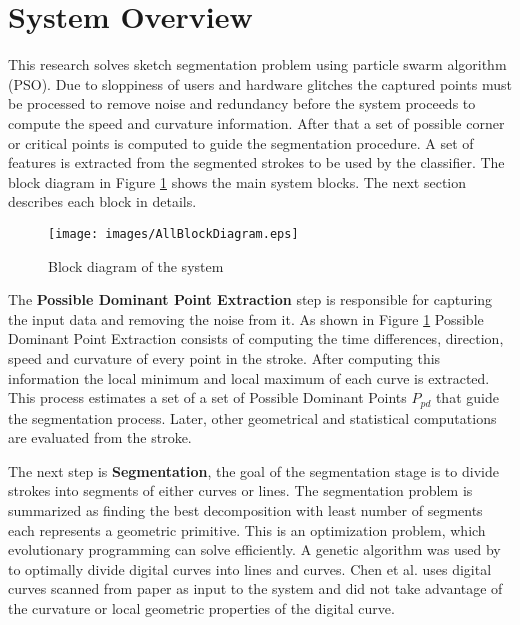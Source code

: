 \section{System Overview}
\label{sec:AnOverviewOfTheSystem}
   This research solves sketch segmentation problem using particle swarm algorithm (PSO).  Due to sloppiness of users and hardware glitches the captured points must be processed to remove noise and redundancy before the system proceeds to compute the speed and curvature information. After that a set of possible corner or critical points is computed to guide the segmentation procedure.  A set of features is extracted from the segmented strokes to be used by the classifier.  %
The block diagram in Figure \ref{fig:Blockdiagram} shows the main system blocks. The next section describes each block in details.
\begin{figure}[]
	\centering
	
\begin{center}
	\texttt{[image: images/AllBlockDiagram.eps]}
	\caption[The System Block Diagram]{Block diagram of the system}
	\label{fig:Blockdiagram}
\end{center}
\end{figure}
 


The \textbf{Possible Dominant Point Extraction} step is responsible for capturing the input data and removing the noise from it. As shown in Figure \ref{fig:Blockdiagram} Possible Dominant Point Extraction consists of computing the time differences, direction, speed and curvature of every point in the stroke. After computing this information the local minimum and local maximum of each curve is extracted. This process estimates a set of a set of Possible Dominant Points $P_{pd}$ that guide the segmentation process. Later, other geometrical and statistical computations are evaluated from the stroke. %
 
  
The next step is \textbf{Segmentation}, the goal of the segmentation stage is to divide strokes into segments of either curves or lines. The segmentation problem is summarized as finding the best decomposition with least number of segments each represents a geometric primitive. This is an optimization problem, which evolutionary programming can solve efficiently. A genetic algorithm was used by \cite{CruveDivisionSwarm} to optimally divide digital curves into lines and curves. Chen et al.\cite{CruveDivisionSwarm} uses digital curves scanned from paper as input to the system and did not take advantage of the curvature or local geometric properties of the digital curve.

